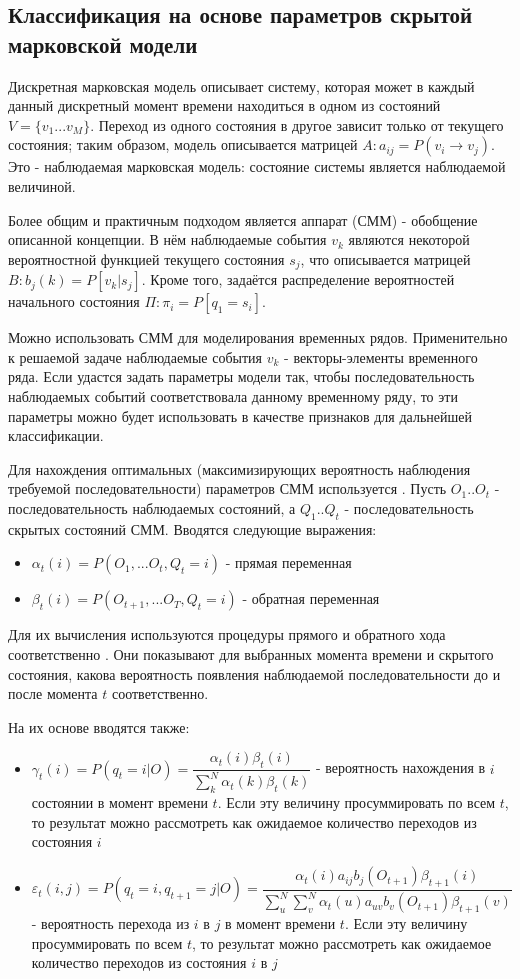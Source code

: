 \subsection{Классификация на основе параметров скрытой марковской модели}

Дискретная марковская модель описывает систему, которая может в каждый данный дискретный момент времени находиться в одном из состояний $V=\{v_1...v_M\}$. Переход из одного состояния в другое зависит только от текущего состояния; таким образом, модель описывается матрицей $A: a_{ij}=P(v_i \to v_j)$. Это - наблюдаемая марковская модель: состояние системы является наблюдаемой величиной. 

Более общим и практичным подходом является аппарат  (СММ) - обобщение описанной концепции. В нём наблюдаемые события $v_k$ являются некоторой вероятностной функцией текущего состояния $s_j$, что описывается матрицей $B: b_j(k)=P[v_k | s_j]$. Кроме того, задаётся распределение вероятностей начального состояния $\Pi: \pi_i=P[q_1=s_i]$. 

Можно использовать СММ для моделирования временных рядов. Применительно к решаемой задаче наблюдаемые события $v_k$ - векторы-элементы временного ряда. Если удастся задать параметры модели так, чтобы последовательность наблюдаемых событий соответствовала данному временному ряду, то эти параметры можно будет использовать в качестве признаков для дальнейшей классификации.

Для нахождения оптимальных (максимизирующих вероятность наблюдения требуемой последовательности) параметров СММ используется . Пусть $O_1..O_t$ - последовательность наблюдаемых состояний, а $Q_1..Q_t$ - последовательность скрытых состояний СММ. Вводятся следующие выражения:
\begin{itemize}
\item $\alpha_t(i)=P(O_1, ... O_t , Q_t=i)$ - прямая переменная
\item $\beta_t(i)=P(O_{t+1}, ... O_T , Q_t=i)$ - обратная переменная
\end{itemize}
Для их вычисления используются процедуры прямого и обратного хода соответственно \cite{hmm_review}. Они показывают для выбранных момента времени и скрытого состояния, какова вероятность появления наблюдаемой последовательности до и после момента $t$ соответственно. 

На их основе вводятся также:
\begin{itemize}
\item $\gamma_t(i)=P(q_t=i | O)=\dfrac{\alpha_t(i)\beta_t(i)}{\sum_k^N\alpha_t(k)\beta_t(k)}$ - вероятность нахождения в $i$ состоянии в момент времени $t$. Если эту величину просуммировать по всем $t$, то результат можно рассмотреть как ожидаемое количество переходов из состояния $i$
\item $\varepsilon_t(i,j)=P(q_t=i, q_{t+1}=j | O)=\dfrac{\alpha_t(i)a_{ij}b_j(O_{t+1})\beta_{t+1}(i)}{\sum_u^N\sum_v^N\alpha_t(u)a_{uv}b_v(O_{t+1})\beta_{t+1}(v)}$ - вероятность перехода из $i$ в $j$ в момент времени $t$. Если эту величину просуммировать по всем $t$, то результат можно рассмотреть как ожидаемое количество переходов из состояния $i$ в $j$
\end{itemize}

